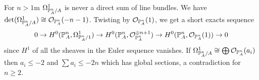 \begin{example}
    For $n>1$m $\Omega^{1}_{\mathbb{P}^{n}_{A}/A}$ is never a direct sum of line bundles. We have $\det(\Omega^{1}_{\mathbb{P}^{n}_{A}/A})\cong\mathcal{O}_{\mathbb{P}^{n}_{A}}(-n-1)$. Twisting by $\mathcal{O}_{\mathbb{P}^{n}_{A}}(1)$, we get a short exacts sequence 
    $$0\to H^{0}(\mathbb{P}^{n}_{A},\Omega^{1}_{\mathbb{P}^{n}_{A}/1})\to H^{0}(\mathbb{P}^{n}_{A},\mathcal{O}_{\mathbb{P}^{n}_{A}}^{\oplus n+1})\to H^{0}(\mathbb{P}^{n}_{A},\mathcal{O}_{\mathbb{P}^{n}_{A}}(1))\to0$$
    since $H^{1}$ of all the sheaves in the Euler sequence vanishes. If $\Omega^{1}_{\mathbb{P}^{n}_{A}/A}\cong\bigoplus\mathcal{O}_{\mathbb{P}^{n}_{A}}(a_{i})$ then $a_{i}\leq-2$ and $\sum a_{i}\leq -2n$ which has global sections, a contradiction for $n\geq 2$. 
\end{example}